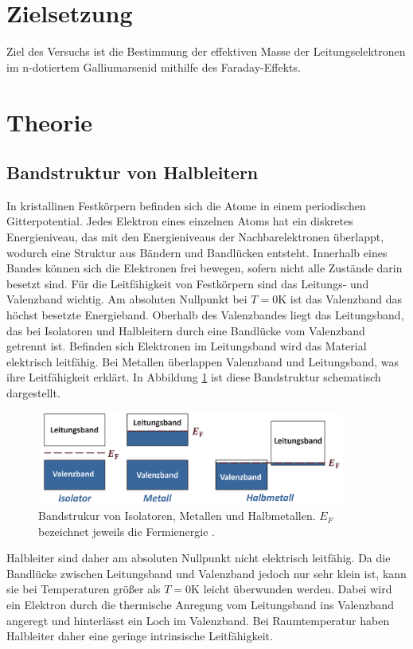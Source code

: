 



\maketitle
\section{Zielsetzung}
Ziel des Versuchs ist die Bestimmung der effektiven Masse der Leitungselektronen im n-dotiertem Galliumarsenid 
mithilfe des Faraday-Effekts.

\section{Theorie}
\subsection{Bandstruktur von Halbleitern}
In kristallinen Festkörpern befinden sich die Atome in einem periodischen Gitterpotential. Jedes Elektron eines einzelnen
Atoms hat ein diskretes Energieniveau, das mit den Energieniveaus der Nachbarelektronen überlappt, wodurch eine
Struktur aus Bändern und Bandlücken entsteht. Innerhalb eines Bandes können sich die Elektronen frei bewegen, sofern nicht alle 
Zustände darin besetzt sind. 
Für die Leitfähigkeit von Festkörpern sind das Leitungs- und Valenzband wichtig.
Am absoluten Nullpunkt bei $T = 0 \si{\kelvin}$ ist das Valenzband das höchst besetzte Energieband. 
Oberhalb des Valenzbandes liegt das Leitungsband, das bei Isolatoren und Halbleitern durch eine Bandlücke vom 
Valenzband getrennt ist. Befinden sich Elektronen im Leitungsband wird das Material elektrisch leitfähig.
Bei Metallen überlappen Valenzband und Leitungsband, was ihre Leitfähigkeit erklärt.
In Abbildung \ref{fig:tfig1} ist diese Bandstruktur schematisch dargestellt.
\FloatBarrier
\begin{figure}[h]
    \centering
    \includegraphics[width=0.9\textwidth]{band.png}
    \caption{Bandstrukur von Isolatoren, Metallen und Halbmetallen. $E_F$ bezeichnet jeweils die Fermienergie \cite[346]{quelle01}.}
    \label{fig:tfig1}
\end{figure}
\FloatBarrier
\noindent
Halbleiter sind daher am absoluten Nullpunkt nicht elektrisch leitfähig. Da die Bandlücke zwischen Leitungsband und 
Valenzband jedoch nur sehr klein ist, kann sie bei Temperaturen größer als $T = 0 \si{\kelvin}$ leicht überwunden werden. Dabei wird ein 
Elektron durch die thermische Anregung vom Leitungsband ins Valenzband angeregt und hinterlässt ein Loch im Valenzband. 
Bei Raumtemperatur haben Halbleiter daher eine geringe intrinsische Leitfähigkeit. 

